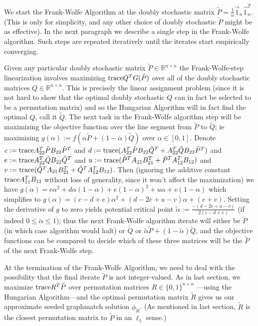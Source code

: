 \documentclass[12pt]{article}
\newcommand{\R}{\mathbb{R}}
\newcommand{\tr}{\textup{trace}}
\begin{document}
We start the Frank-Wolfe Algorithm at the doubly stochastic matrix
$\tilde{P}=\frac{1}{n}\vec{1}_n \vec{1}_n^T$. (This is only for
simplicity, and any other choice of doubly stochastic $\tilde{P}$ might
be as effective). In the next paragraph we describe a single step in the
Frank-Wolfe algorithm. Such steps are repeated iteratively until
the iterates start empirically converging.


Given any particular doubly stochastic matrix $\tilde{P} \in \R^{n \times n}$
the Frank-Wolfe-step linearization involves maximizing $\tr Q^TG(\tilde{P})$ over all of the doubly stochastic matrices $Q \in \R ^{n \times n}$.
This is precisely the linear assignment problem (since it is not hard to show that 
the optimal doubly stochastic $Q$ can in fact be selected to be 
a permutation matrix) and so
the Hungarian Algorithm
will in fact find the optimal $Q$, call it
$\tilde{Q}$.
The next task in the Frank-Wolfe algorithm step
will be maximizing the objective function over the line
segment from $\tilde{P}$ to $\tilde{Q}$;  ie maximizing $g(\alpha):=f(\alpha \tilde{P}
+(1-\alpha ) \tilde{Q})$ over $\alpha \in [0,1]$. Denote
$c:=\tr A^T_{22} \tilde{P} B_{22} \tilde{P}^T$ and
$d:=\tr (A^T_{22} \tilde{P} B_{22} \tilde{Q}^T +
    A^T_{22} \tilde{Q} B_{22} \tilde{P}^T)$ and
$e:=\tr A^T_{22} \tilde{Q} B_{22} \tilde{Q}^T$ and
$u:=\tr ( \tilde{P}^TA_{21}B_{21}^T   + \tilde{P}^TA_{12}^TB_{12} )$ and
$v:=\tr ( \tilde{Q}^TA_{21}B_{21}^T   + \tilde{Q}^TA_{12}^TB_{12} )$. Then
(ignoring the additive constant $\tr A_{11}^TB_{11}$ without loss of
generality, since it won't affect the maximization)
we have $g(\alpha)=c \alpha^2+d \alpha (1-\alpha)
+e(1-\alpha)^2+u \alpha + v(1-\alpha)$  which simplifies to
$g(\alpha)=(c-d+e)\alpha^2+(d-2e+u-v)\alpha + (e+v)$. Setting the
derivative of $g$ to zero yields potential critical point
$\tilde{\alpha}:=\frac{-(d-2e+u-v)}{2(c-d+e)}$ (if indeed
$0 \leq \tilde{\alpha}\leq 1$); thus the next Frank-Wolfe algorithm
iterate will either be $\tilde{P}$ (in which case algorithm would halt)
or $\tilde{Q}$ or $\tilde{\alpha}\tilde{P}+(1-\tilde{\alpha})\tilde{Q}$, and
the objective functions can be compared to decide which of these three matrices
will be the $\tilde{P}$ of the next Frank-Wolfe step.

At the termination of the Frank-Wolfe Algorithm, we need to deal with
the possibility that the final iterate $\tilde{P}$ is not integer-valued.
As in last section, we maximize $\tr R^T\tilde{P}$ over permutation
matrices $R \in \{ 0,1 \}^{n \times n}$
---using the Hungarian Algorithm---and the optimal permutation matrix $\tilde{R}$
gives us our approximate seeded graphmatch solution $\phi_{\tilde{R}}$. (As mentioned
in last section, $\tilde{R}$ is the closest permutation matrix to $\tilde{P}$
in an $\ell_1$ sense.)
\end{document}
